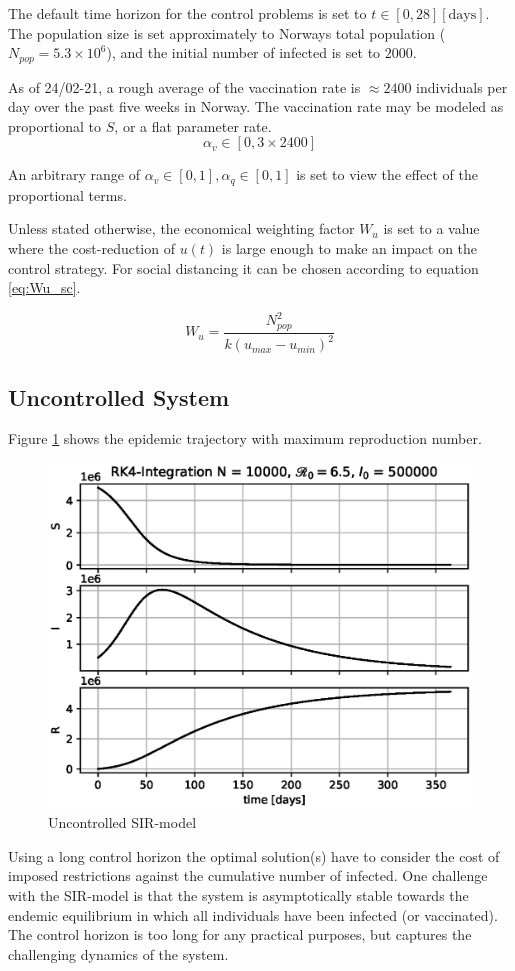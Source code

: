 The default time horizon for the control problems is set to $t \in [0, 28] [\text{days}]$. The population size is set approximately to Norways total population ($N_{pop} = 5.3\times 10^6$), and the initial number of infected is set to $2000$. 

As of 24/02-21, a rough average of the vaccination rate is $\approx 2400$ individuals per day over the past five weeks in Norway. The vaccination rate may be modeled as proportional to $S$, or a flat parameter rate. 
\begin{equation}
    \alpha_v \in [0, 3\times2400]
\end{equation}

An arbitrary range of $\alpha_v \in [0, 1], \alpha_q \in [0, 1]$ is set to view the effect of the proportional terms.

Unless stated otherwise, the economical weighting factor $W_u$ is set to a value where the cost-reduction of $u(t)$ is large enough to make an impact on the control strategy. For social distancing it can be chosen according to equation \ref{eq:Wu_sc}.

\begin{equation}
    W_u = \frac{N_{pop}^2}{k(u_{max}-u_{min})^2}
    \label{eq:Wu_sc}
\end{equation}

\subsection{Uncontrolled System}
Figure \ref{fig:SIR_Uncontrolled} shows the epidemic trajectory with maximum reproduction number.

\begin{figure}[H]
    \centering
    \includegraphics[width=.8\textwidth]{pythonProject/Figures/Uncontrolled_SIR.eps}
    \caption{Uncontrolled SIR-model}
    \label{fig:SIR_Uncontrolled}
\end{figure}

Using a long control horizon the optimal solution(s) have to consider the cost of imposed restrictions against the cumulative number of infected. One challenge with the SIR-model is that the system is asymptotically stable towards the endemic equilibrium in which all individuals have been infected (or vaccinated). The control horizon is too long for any practical purposes, but captures the challenging dynamics of the system. 




